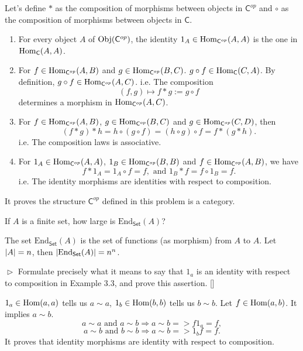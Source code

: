 \begin{solution}
Let's define $\ast$ as the composition of morphisms between objects in $\mathsf{C}^{op}$ and $\circ$ 
as the composition of morphisms between objects in $\mathsf{C}$.
\begin{enumerate}
\item For every object $A$ of $\mathrm{Obj}(\mathsf{C}^{op})$, the identity $1_A \in \mathrm{Hom}_{\mathsf{C}^{op}} (A,A)$ is the one 
in $\mathrm{Hom}_{\mathsf{C}}(A,A)$.
\item For $f\in \mathrm{Hom}_{\mathsf{C}^{op}} (A,B)$ and $g\in \mathrm{Hom}_{\mathsf{C}^{op}}(B,C)$. 
$g\circ f \in \mathrm{Hom}_\mathsf{C}(C,A)$. By definition, $g\circ f \in \mathrm{Hom}_{\mathsf{C}^{op}}(A,C)$. i.e. The composition
$$(f,g) \mapsto f\ast g := g\circ f$$ determines a morphism in $\mathrm{Hom}_{\mathsf{C}^{op}}(A,C)$.
\item For $f\in \mathrm{Hom}_{\mathsf{C}^{op}} (A,B)$, $g\in \mathrm{Hom}_{\mathsf{C}^{op}}(B,C)$ and $g\in \mathrm{Hom}_{\mathsf{C}^{op}}(C,D)$, then
$$(f\ast g)\ast h = h\circ (g\circ f) = (h\circ g)\circ f = f\ast(g\ast h).$$
i.e. The composition laws is associative.
\item For $1_A \in \mathrm{Hom}_{\mathsf{C}^{op}}(A,A)$, $1_B \in \mathrm{Hom}_{\mathsf{C}^{op}}(B,B)$ and $f\in \mathrm{Hom}_{\mathsf{C}^{op}} (A,B)$, we have
$$f\ast 1_A = 1_A\circ f = f, \text{ and } 1_B\ast f = f\circ 1_B = f.$$
i.e. The identity morphisms are identities with respect to composition.
\end{enumerate}
It proves the structure $\mathsf{C}^{op}$ defined in this problem is a category. 
\end{solution}

\begin{problem}[3.2]
  If $A$ is a finite set, how large is $\mathrm{End}_{\mathsf{Set}}(A)$?
\end{problem}

\begin{solution}
The set $\mathrm{End}_{\mathsf{Set}}(A)$ is the set of functions (as morphism) from $A$ to $A$. Let $\left|A\right|=n$, then 
$\left|\mathrm{End}_{\mathsf{Set}}(A)\right| = n^n$.
\end{solution}

\begin{problem}[3.3]
  $\vartriangleright$ Formulate precisely what it means to say that $1_a$ is an identity with respect to composition in Example 3.3, 
  and prove this assertion. []
\end{problem}

\begin{solution}
$1_a\in \mathrm{Hom}(a,a)$ tells us $a\sim a$, $1_b\in \mathrm{Hom}(b,b)$ tells us $b\sim b$. Let $f\in\mathrm{Hom}(a,b)$. It implies $a\sim b$.
$$a\sim a \text{ and } a\sim b \Longrightarrow  a\sim b => f1_a = f,$$
$$a\sim b \text{ and } b\sim b \Longrightarrow  a\sim b => 1_bf = f.$$
It proves that identity morphisms are identity with respect to composition.
\end{solution}

